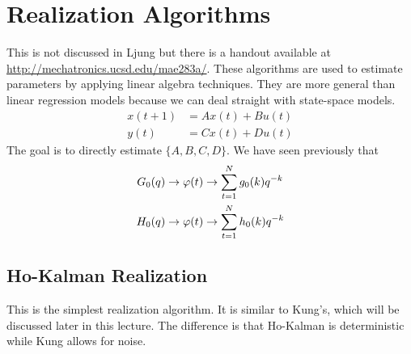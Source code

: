 \section{Realization Algorithms}
This is not discussed in Ljung but there is a handout available at \\
\href{http://mechatronics.ucsd.edu/mae283a/}{http://mechatronics.ucsd.edu/mae283a/}. These algorithms are used to estimate parameters by applying linear algebra techniques. They are more general than linear regression models because we can deal straight with state-space models.
\begin{align*}
x(t+1) &= Ax(t)+Bu(t) \\
y(t) &= Cx(t)+Du(t)
\end{align*}
The goal is to directly estimate $\{A,B,C,D\}$. We have seen previously that
\begin{align*}
G_0(q) &\to \varphi(t) \to \sum_{t=1}^N g_0(k)q^{-k} \\
H_0(q) &\to \varphi(t) \to \sum_{t=1}^N h_0(k)q^{-k}
\end{align*}

\subsection{Ho-Kalman Realization}
This is the simplest realization algorithm. It is similar to Kung's, which will be discussed later in this lecture. The difference is that Ho-Kalman is deterministic while Kung allows for noise.

